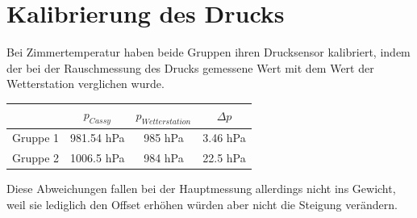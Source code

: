 \documentclass[12pt,a4paper]{article}
\begin{document}
\section{Kalibrierung des Drucks}
Bei Zimmertemperatur haben beide Gruppen ihren Drucksensor kalibriert, indem der bei der Rauschmessung des Drucks gemessene Wert mit dem Wert der Wetterstation verglichen wurde.
\begin{table}[H]\centering
\begin{tabular}{|c|c|c|c|}
\hline 
 & $p_{Cassy}$ & $p_{Wetterstation}$ & $\Delta p$ \\ 
\hline 
Gruppe 1 & 981.54 hPa & 985 hPa & 3.46 hPa \\ 
\hline 
Gruppe 2 & 1006.5 hPa & 984 hPa & 22.5 hPa \\ 
\hline 
\end{tabular} 
\end{table}

Diese Abweichungen fallen bei der Hauptmessung allerdings nicht ins Gewicht, weil sie lediglich den Offset erhöhen würden aber nicht die Steigung verändern.
\end{document}
